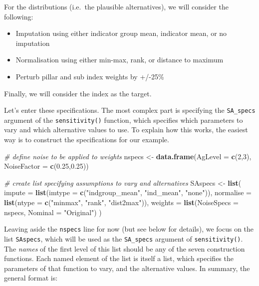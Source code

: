 \documentclass[
]{book}
\newenvironment{Shaded}{\begin{snugshade}}{\end{snugshade}}
\newcommand{\CommentTok}[1]{\textcolor[rgb]{0.56,0.35,0.01}{\textit{#1}}}
\newcommand{\DataTypeTok}[1]{\textcolor[rgb]{0.13,0.29,0.53}{#1}}
\newcommand{\DecValTok}[1]{\textcolor[rgb]{0.00,0.00,0.81}{#1}}
\newcommand{\FloatTok}[1]{\textcolor[rgb]{0.00,0.00,0.81}{#1}}
\newcommand{\KeywordTok}[1]{\textcolor[rgb]{0.13,0.29,0.53}{\textbf{#1}}}
\newcommand{\NormalTok}[1]{#1}
\newcommand{\StringTok}[1]{\textcolor[rgb]{0.31,0.60,0.02}{#1}}
\providecommand{\tightlist}{%
  \setlength{\itemsep}{0pt}\setlength{\parskip}{0pt}}
\begin{document}
For the distributions (i.e.~the plausible alternatives), we will consider the following:

\begin{itemize}
\tightlist
\item
  Imputation using either indicator group mean, indicator mean, or no imputation
\item
  Normalisation using either min-max, rank, or distance to maximum
\item
  Perturb pillar and sub index weights by +/-25\%
\end{itemize}

Finally, we will consider the index as the target.

Let's enter these specifications. The most complex part is specifying the \texttt{SA\_specs} argument of the \texttt{sensitivity()} function, which specifies which parameters to vary and which alternative values to use. To explain how this works, the easiest way is to construct the specifications for our example.

\begin{Shaded}
\begin{Highlighting}[]
\CommentTok{# define noise to be applied to weights}
\NormalTok{nspecs <-}\StringTok{ }\KeywordTok{data.frame}\NormalTok{(}\DataTypeTok{AgLevel =} \KeywordTok{c}\NormalTok{(}\DecValTok{2}\NormalTok{,}\DecValTok{3}\NormalTok{), }\DataTypeTok{NoiseFactor =} \KeywordTok{c}\NormalTok{(}\FloatTok{0.25}\NormalTok{,}\FloatTok{0.25}\NormalTok{))}

\CommentTok{# create list specifying assumptions to vary and alternatives}
\NormalTok{SAspecs <-}\StringTok{ }\KeywordTok{list}\NormalTok{(}
  \DataTypeTok{impute =} \KeywordTok{list}\NormalTok{(}\DataTypeTok{imtype =} \KeywordTok{c}\NormalTok{(}\StringTok{"indgroup_mean"}\NormalTok{, }\StringTok{"ind_mean"}\NormalTok{, }\StringTok{"none"}\NormalTok{)),}
  \DataTypeTok{normalise =} \KeywordTok{list}\NormalTok{(}\DataTypeTok{ntype =} \KeywordTok{c}\NormalTok{(}\StringTok{"minmax"}\NormalTok{, }\StringTok{"rank"}\NormalTok{, }\StringTok{"dist2max"}\NormalTok{)),}
  \DataTypeTok{weights =} \KeywordTok{list}\NormalTok{(}\DataTypeTok{NoiseSpecs =}\NormalTok{ nspecs, }\DataTypeTok{Nominal =} \StringTok{"Original"}\NormalTok{)}
\NormalTok{)}
\end{Highlighting}
\end{Shaded}

Leaving aside the \texttt{nspecs} line for now (but see below for details), we focus on the list \texttt{SAspecs}, which will be used as the \texttt{SA\_specs} argument of \texttt{sensitivity()}. The \emph{names} of the first level of this list should be any of the seven construction functions. Each named element of the list is itself a list, which specifies the parameters of that function to vary, and the alternative values. In summary, the general format is:
\end{document}

